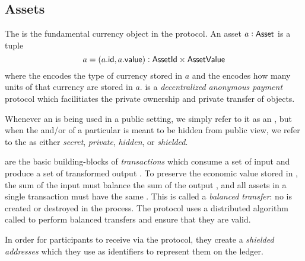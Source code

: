 \subsection{Assets}

The \Asset{} is the fundamental currency object in the \MantaPay{} protocol. An asset $a : {\textsf{Asset}}$ is a tuple
\[a = (a.{\textsf{id}}, a.{\textsf{value}}) : {\textsf{AssetId}} \times {\textsf{AssetValue}}\]
where the \AssetId{} encodes the type of currency stored in $a$ and the \AssetValue{} encodes how many units of that currency are stored in $a$.  \MantaPay{} is a \emph{decentralized anonymous payment} protocol which facilitiates the private ownership and private transfer of \Asset{} objects. 

Whenever an \Asset{} is being used in a public setting, we simply refer to it as an \Asset{}, but when the \AssetId{} and/or \AssetValue{} of a particular \Asset{} is meant to be hidden from public view, we refer to the \Asset{} as either \emph{secret}, \emph{private}, \emph{hidden}, or \emph{shielded}.

 are the basic building-blocks of \emph{transactions} which consume a set of input  and produce a set of transformed output . To preserve the economic value stored in , the sum of the input  must balance the sum of the output , and all assets in a single transaction must have the same \AssetId{}\footnotemark{}. This is called a \emph{balanced transfer}: no \AssetValue{} is created or destroyed in the process. The \MantaPay{} protocol uses a distributed algorithm called \Transfer{} to perform balanced transfers and ensure that they are valid.


In order for \MantaPay{} participants to receive  via the \Transfer{} protocol, they create a \emph{shielded addresses} which they use as identifiers to represent them on the ledger.

\begin{center}
    \vspace{1em}
    \begin{mdframed}[leftmargin=0.2\textwidth, rightmargin=0.2\textwidth]
        \begin{center}
        \end{center}
    \end{mdframed}
    \vspace{-1em}
\end{center}

